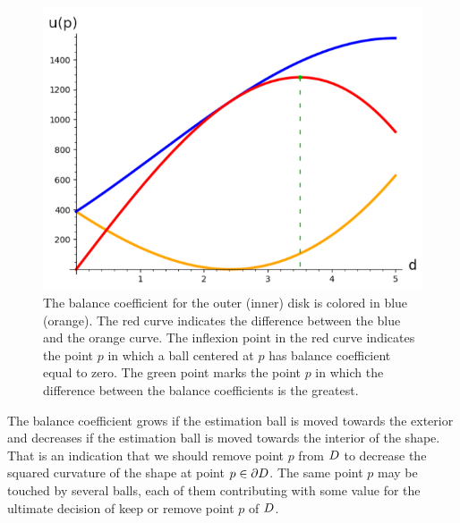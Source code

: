 \begin{figure}
\begin{minipage}{0.25\textwidth}
\end{minipage}%
\begin{minipage}{0.75\textwidth}
\includegraphics[scale=0.75]{figures/chapter7/balance-coefficient-p2-with-sum-2.png}
\end{minipage}
\caption{ The balance coefficient for the outer (inner) disk is colored in blue (orange). The red curve indicates the difference between the blue and the orange curve. The inflexion point in the red curve indicates the point $p$ in which a ball centered at $p$ has balance coefficient equal to zero. The green point marks the point $p$ in which the difference between the balance coefficients is the greatest. }
\label{ch7:fig:balance-plot}
\end{figure}


The balance coefficient grows if the estimation ball is moved towards the exterior and decreases if the estimation ball is moved towards the interior of the shape. That is an indication that we should remove point $p$ from $D$ to decrease the squared curvature of the shape at point $p \in \partial D$. The same point $p$ may be touched by several balls, each of them contributing with some value for the ultimate decision of keep or remove point $p$ of $D$. 


